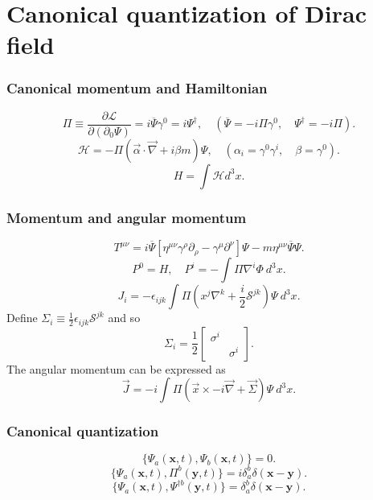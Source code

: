 \section{Canonical quantization of Dirac field}
\subsubsection{Canonical momentum and Hamiltonian}
\[\Pi \equiv \frac{\partial \mathcal{L}}{\partial(\partial_0 \Psi)} = i \overline{\Psi}\gamma^0 = i \Psi^{\dagger} , \quad (\overline{\Psi} = -i \Pi \gamma^0 , \quad \Psi^{\dagger} = -i \Pi).\]
\[\mathcal{H} = -\Pi (\vec{\alpha} \cdot \vec{\nabla} + i \beta m)\Psi , \quad (\alpha_i = \gamma^0 \gamma^i , \quad \beta = \gamma^0).\]
\[H = \int \mathcal{H} d^3x.\]
\subsubsection{Momentum and angular momentum}
\[T^{\mu \nu} = i \overline{\Psi} \left[ \eta^{\mu \nu} \gamma^{\rho} \partial_{\rho} - \gamma^{\mu} \partial^{\nu} \right]\Psi -m \eta^{\mu \nu} \overline{\Psi}\Psi.\]
\[P^0 = H , \quad P^i = -\int \Pi \nabla^i \Phi \: d^3x.\]
\[J_i = -\epsilon_{ijk} \int \Pi( x^j \nabla^k + \frac{i}{2} \mathcal{S}^{jk}) \Psi  \: d^3x .\]
Define $\Sigma_i \equiv \frac{1}{2} \epsilon_{ijk} \mathcal{S}^{jk}$ and so
\[\Sigma_i = \frac{1}{2}\left[ \begin{matrix} \sigma^i & \\ & \sigma^i \end{matrix} \right] .\]
The angular momentum can be expressed as
\[\vec{J} = -i \int \Pi( \vec{x} \times -i\vec{\nabla} +  \vec{\Sigma}) \Psi \: d^3x .\]
\subsubsection{Canonical quantization}
\[\{\Psi_a(\bm{x},t),\Psi_b(\bm{x},t)\} = 0.\]
\[\{\Psi_a(\bm{x},t),\Pi^b(\bm{y},t)\} = i\delta^b_a \delta(\bm{x}-\bm{y}).\]
\[\{\Psi_a(\bm{x},t),\Psi^{\dagger b}(\bm{y},t)\} = \delta^b_a \delta(\bm{x}-\bm{y}).\]
